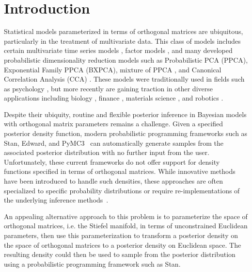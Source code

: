\documentclass[ba]{imsart}
\numberwithin{equation}{section}
\theoremstyle{plain}
\begin{document}
\section{Introduction}
Statistical models parameterized in terms of orthogonal matrices are ubiquitous, particularly in the treatment of multivariate data. This class of models includes certain multivariate time series models \citep{brockwell2002introduction}, factor models \citep{johnson2004multivariate}, and many developed probabilistic dimensionality reduction models such as Probabilistic PCA (PPCA),  Exponential Family PPCA (BXPCA), mixture of PPCA \citep{ghahramani1996algorithm}, and Canonical Correlation Analysis (CCA) \citep[Chapt.~12.5]{murphy2012machine}. These models were traditionally used in fields such as psychology \citep{ford1986application}, but more recently are gaining traction in other diverse applications including biology \citep{hamelryck2006sampling}, finance \citep{lee2007bayesian}, materials science \citep{oh20172d}, and robotics \citep{lu1997robot}.

\noindent Despite their ubiquity, routine and flexible posterior inference in Bayesian models with orthogonal matrix parameters remains a challenge. Given a specified posterior density function, modern probabilistic programming frameworks such as Stan, Edward, and PyMC3~\citep{carpenter2016stan,tran2016edward,salvatier2016probabilistic} can automatically generate samples from the associated posterior distribution with no further input from the user. Unfortunately, these current frameworks do not offer support for density functions specified in terms of orthogonal matrices. While innovative methods have been introduced to handle such densities, these approaches are often specialized to specific probability distributions or require re-implementations of the underlying inference methods~\citep{hoff2009simulation,brubaker2012family,byrne2013geodesic,holbrook2016bayesian}. 

\noindent An appealing alternative approach to this problem is to parameterize the space of orthogonal matrices, i.e. the Stiefel manifold, in terms of unconstrained Euclidean parameters, then use this parameterization to transform a posterior density on the space of orthogonal matrices to a posterior density on Euclidean space. The resulting density could then be used to sample from the posterior distribution using a probabilistic programming framework such as Stan. 
\end{document}
